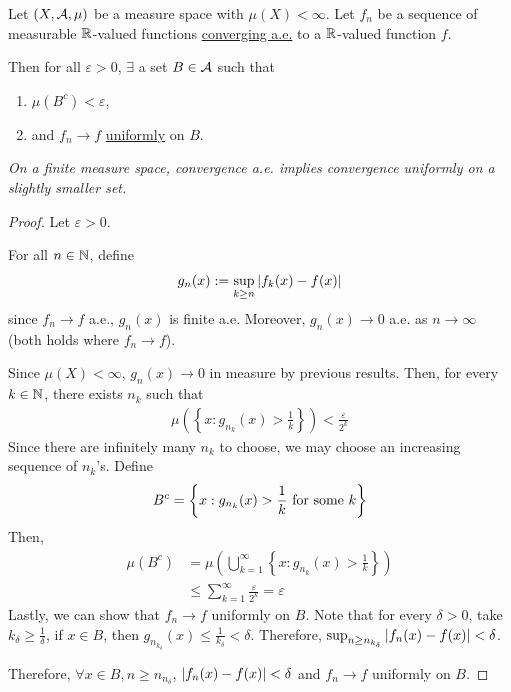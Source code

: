 \documentclass[11pt]{article}
\begin{document}
	\begin{theorem}
		Let $(X, \mathcal{{A}}, \mu)$ be a measure space with $\mu(X) < \infty$. Let $f_n$ be a sequence of measurable $\mathbb{R}$-valued functions \ul{converging a.e.} to a $\mathbb{R}$-valued function $f$.
		
		Then for all $\varepsilon > 0$, $\exists$ a set $B \in \mathcal{{A}}$ such that
		\begin{enumerate}
			\item $\mu(B^c) < \varepsilon$,
			\item and $f_n \to f$ \ul{uniformly} on $B$.
		\end{enumerate}
		\emph{On a finite measure space, convergence a.e. implies convergence uniformly on a slightly smaller set.}
		\begin{proof}
			Let $\varepsilon > 0$.
			
			For all $n \in \mathbb{N}$, define
			\begin{align}
				g_n(x) := \sup_{k \geq n} \left \vert {f_k(x) - f(x)} \right \vert
			\end{align}
			since $f_n \to f$ a.e., $g_n(x)$ is finite a.e. Moreover, $g_n(x) \to 0$ a.e. as $n \to \infty$ (both holds where $f_n \to f$).
			
			Since $\mu(X) < \infty$, $g_n(x) \to 0$ in measure by previous results. Then, for every $k \in \mathbb{N}$, there exists $n_k$ such that
			\begin{align}
				\mu\left(\left\{x : g_{n_k}(x) > \frac{1}{k} \right\}\right) < \frac{\varepsilon}{2^k}
			\end{align}
			Since there are infinitely many $n_k$ to choose, we may choose an increasing sequence of $n_k$'s. Define
			\begin{align}
				B^c = \left\{ x: g_{n_k}(x) > \frac{1}{k} \text{{ for some }} k\right\}
			\end{align}
			Then,
			\begin{align}
				\mu(B^c) &= \mu\left(\bigcup_{k=1}^\infty \left\{ x: g_{n_k}(x) > \frac{1}{k} \right\}\right) \\
				&\leq \sum_{k=1}^\infty \frac{\varepsilon}{2^k} = \varepsilon
			\end{align}
			Lastly, we can show that $f_n \to f$ uniformly on $B$. Note that for every $\delta > 0$, take $k_\delta \geq \frac{1}{\delta}$, if $x \in B$, then $g_{n_{k_\delta}}(x) \leq \frac{1}{k_\delta} < \delta$. Therefore, $\sup_{n \geq n_{k_\delta}} \left \vert {f_n(x) - f(x)} \right \vert < \delta$.
			
			Therefore, $\forall x\in B, n \geq n_{n_\delta}$, $\left \vert {f_n(x) - f(x)} \right \vert < \delta$ and $f_n \to f$ uniformly on $B$.
		\end{proof}
	\end{theorem}
	
\end{document}
